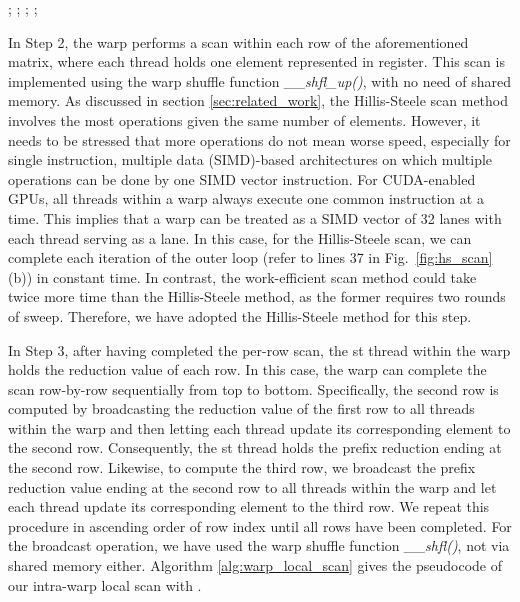 \documentclass[article]{elsarticle}
\renewcommand{\hl}[1]{#1}
\begin{document}
{\begin{algorithm}[!h]
\begin{algorithmic}[1]
        \If {}
        	;
        \EndIf
    \EndFor
        \If {}
        	;
        \EndIf
    \EndFor
        \If {}
        	;
        \EndIf
    \EndFor
        \If {}
        	;
        \EndIf
    \EndFor
    
\EndProcedure
\end{algorithmic}
\end{algorithm}


\hl{In Step 2}, the warp performs a scan within each row of the aforementioned matrix, where each thread holds one element represented in register. This scan is implemented using the warp shuffle function \textit{\_\_shfl\_up()}, with no need of shared memory. As discussed in section \ref{sec:related_work}, the Hillis-Steele scan method involves the most  operations given the same number of elements. However, it needs to be stressed that more  operations do not mean worse speed, especially for single instruction, multiple data (SIMD)-based architectures on which multiple operations can be done by one SIMD vector instruction. For CUDA-enabled GPUs, all threads within a warp always execute one common instruction at a time. This implies that a warp can be treated as a SIMD vector of 32 lanes with each thread serving as a lane. In this case, for the Hillis-Steele scan, we can complete each iteration of the outer loop (refer to lines 37 in Fig.~\ref{fig:hs_scan}(b)) in constant time. In contrast, the work-efficient scan method could take twice more time than the Hillis-Steele method, as the former requires two rounds of sweep. Therefore, we have adopted the Hillis-Steele method for this step.

\hl{In Step 3}, after having completed the per-row scan, the st thread within the warp holds the reduction value of each row. In this case, the warp can complete the scan row-by-row sequentially from top to bottom. Specifically, the second row is computed by broadcasting the reduction value of the first row to all threads within the warp and then letting each thread update its corresponding element to the second row. Consequently, the st thread holds the prefix reduction ending at the second row. Likewise, to compute the third row, we broadcast the prefix reduction value ending at the second row to all threads within the warp and let each thread update its corresponding element to the third row. We repeat this procedure in ascending order of row index until all rows have been completed. For the broadcast operation, we have used the warp shuffle function \textit{\_\_shfl()}, not via shared memory either. Algorithm \ref{alg:warp_local_scan} gives the pseudocode of our intra-warp local scan with .

}
\end{document}
